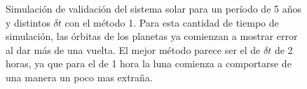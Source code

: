 \begin{figure}
{	\label{fig:ej2_m1_1825_12}
	}
	\caption{
		Simulación de validación del sistema solar para un período de 5 años y distintos $\delta t$
		con el método 1.
		Para esta cantidad de tiempo de simulación, las órbitas de los planetas ya comienzan a mostrar error al dar más de una vuelta.
		El mejor método parece ser el de $\delta t$ de 2 horas, ya que para el de 1 hora la luna comienza a comportarse de una manera un poco mas extraña.
	}
	\label{ fig:res_ej2_m1_1825 }
\end{figure}
